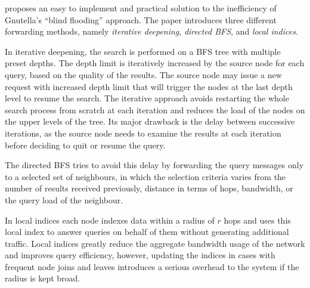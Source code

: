 
\cite{YG-M2002} proposes an easy to implement and practical solution to the
inefficiency of Gnutella's ``blind flooding'' approach. The paper introduces
three different forwarding methods, namely \emph{iterative deepening},
\emph{directed BFS}, and \emph{local indices}.

In iterative deepening, %
the search is
performed on a BFS tree with multiple preset depths. The depth limit is
iteratively increased by the source node for each query, based on the quality of
the results. The source node may issue a new request with increased depth limit
that will trigger the nodes at the last depth level to resume the search. The
iterative approach avoids restarting the whole search process from scratch at
each iteration and reduces the load of the nodes on the upper levels of the
tree. Its major drawback is the delay between successive iterations, as the
source node needs to examine the results at each iteration before deciding to
quit or resume the query.

The directed BFS%
tries to avoid this delay by forwarding the query messages only to a selected
set of neighbours, in which the selection criteria varies from the number of
results received previously, distance in terms of hops, bandwidth, or the query
load of the neighbour.

In local indices%
each node
indexes data within a radius of $r$ hops and uses this local index to answer
queries on behalf of them without generating additional traffic. Local indices
greatly reduce the aggregate bandwidth usage of the network and improves query
efficiency, however, updating the indices in cases with frequent node joins and
leaves introduces a serious overhead to the system if the radius is kept broad.

